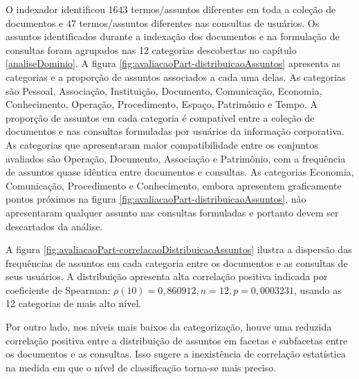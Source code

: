 O indexador identificou 1643 termos/assuntos diferentes em toda a coleção de documentos e 47 termos/assuntos diferentes nas consultas de usuários. Os assuntos identificados durante a indexação dos documentos e na formulação de consultas foram agrupados nas 12 categorias descobertas no capítulo \ref{analiseDominio}. A figura \ref{fig:avaliacaoPart-distribuicaoAssuntos} apresenta as categorias e a proporção de assuntos associados a cada uma delas. As categorias são Pessoal, Associação, Instituição, Documento, Comunicação, Economia, Conhecimento, Operação, Procedimento, Espaço, Patrimônio e Tempo. A proporção de assuntos em cada categoria é compatível entre a coleção de documentos e nas consultas formuladas por usuários da informação corporativa. As categorias que apresentaram maior compatibilidade entre os conjuntos avaliados são Operação, Documento, Associação e Patrimônio, com a frequência de assuntos quase idêntica entre documentos e consultas. As categorias Economia, Comunicação, Procedimento e Conhecimento, embora apresentem graficamente pontos próximos na figura \ref{fig:avaliacaoPart-distribuicaoAssuntos}, não apresentaram qualquer assunto nas consultas formuladas e portanto devem ser descartados da análise.

A figura \ref{fig:avaliacaoPart-correlacaoDistribuicaoAssuntos} ilustra a dispersão das frequências de assuntos em cada categoria entre os documentos e as consultas de seus usuários. A distribuição apresenta alta correlação positiva indicada por coeficiente de Spearman: $\rho(10) = 0,860912, n = 12, p = 0,0003231$, usando as 12 categorias de mais alto nível.

Por outro lado, nos níveis mais baixos da categorização, houve uma reduzida correlação positiva entre a distribuição de assuntos em facetas e subfacetas entre os documentos e as consultas. Isso sugere a inexistência de correlação estatística na medida em que o nível de classificação torna-se mais preciso.

